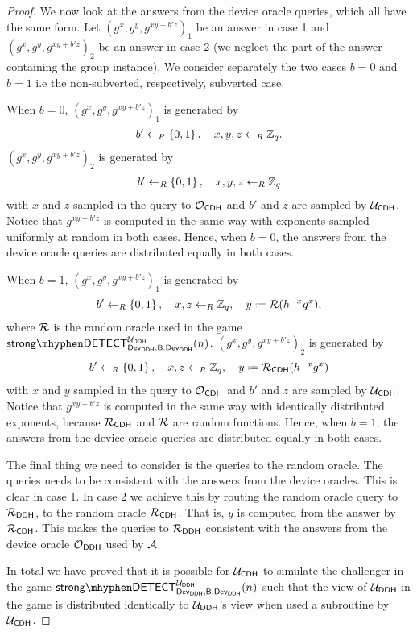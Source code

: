 \begin{proof}
We now look at the answers from the device oracle queries, which all have the same form. Let $(g^x,g^y,g^{xy+b'z})_1$ be an answer in case 1 and $(g^x,g^y,g^{xy+b'z})_2$ be an answer in case 2 (we neglect the part of the answer containing the group instance). We consider separately the two cases $b=0$ and $b=1$ i.e the non-subverted, respectively, subverted case. 

When $b=0$, $(g^x,g^y,g^{xy+b'z})_1$ is generated by 
\begin{align*}
	b'\leftarrow_R\left\{0,1\right\}, \quad x,y,z\leftarrow_R \mathbb{Z}_q. 
\end{align*}
$(g^x,g^y,g^{xy+b'z})_2$ is generated by 
\begin{align*}
	b'\leftarrow_R\left\{0,1\right\}, \quad x,y,z\leftarrow_R\mathbb{Z}_q
\end{align*}
with $x$ and $z$ sampled in the query to $\operatorname{\mathcal{O}}_{\mathsf{CDH}}$ and $b'$ and $z$ are sampled by $\mathcal{U}_{\mathsf{CDH}}$. Notice that $g^{xy+b'z}$ is computed in the same way with exponents sampled uniformly at random in both cases. Hence, when $b=0$, the answers from the device oracle queries are distributed equally in both cases. 

When $b=1$, $(g^x,g^y,g^{xy+b'z})_1$ is generated by 
\begin{align*}
	b'\drawbit, \quad x,z\unileft \Zq, \quad y\defeq \RO(h^{-x}g^x),
\end{align*}
where $\operatorname{\mathcal{R}}$ is the random oracle used in the game $\strongdetect{\dev_{\DDH}}{\bbdev_{\DDH}}{\user_{\DDH}}$. $(g^x,g^y,g^{xy+b'z})_2$ is generated by 
\begin{align*}
	b'\drawbit, \quad x,z\unileft \Zq, \quad y\defeq \RO_{\CDH}(h^{-x}g^x)
\end{align*}
with $x$ and $y$ sampled in the query to $\operatorname{\mathcal{O}}_{\mathsf{CDH}}$ and $b'$ and $z$ are sampled by $\mathcal{U}_{\mathsf{CDH}}$. Notice that $g^{xy+b'z}$ is computed in the same way with identically distributed exponents, because $\operatorname{\mathcal{R}}_{\mathsf{CDH}}$ and $\operatorname{\mathcal{R}}$ are random functions. Hence, when $b=1$, the answers from the device oracle queries are distributed equally in both cases.

The final thing we need to consider is the queries to the random oracle. The queries needs to be consistent with the answers from the device oracles. This is clear in case 1. In case 2 we achieve this by routing the random oracle query to $\operatorname{\mathcal{R}}_{\mathsf{DDH}}$, to the random oracle $\operatorname{\mathcal{R}}_{\mathsf{CDH}}$. That is, $y$ is computed from the answer by $\operatorname{\mathcal{R}}_{\mathsf{CDH}}$. This makes the queries to $\operatorname{\mathcal{R}}_{\mathsf{DDH}}$ consistent with the answers from the device oracle $\operatorname{\mathcal{O}}_{\mathsf{DDH}}$ used by $\mathcal{A}$.

In total we have proved that it is possible for $\mathcal{U}_{\mathsf{CDH}}$ to simulate the challenger in the game $\strongdetect{\dev_{\DDH}}{\bbdev_{\DDH}}{\user_{\DDH}}$ such that the view of $\mathcal{U}_{\mathsf{DDH}}$ in the game is distributed identically to $\mathcal{U}_{\mathsf{DDH}}$'s view when used a subroutine by $\mathcal{U}_{\mathsf{CDH}}$.  
\end{proof}

